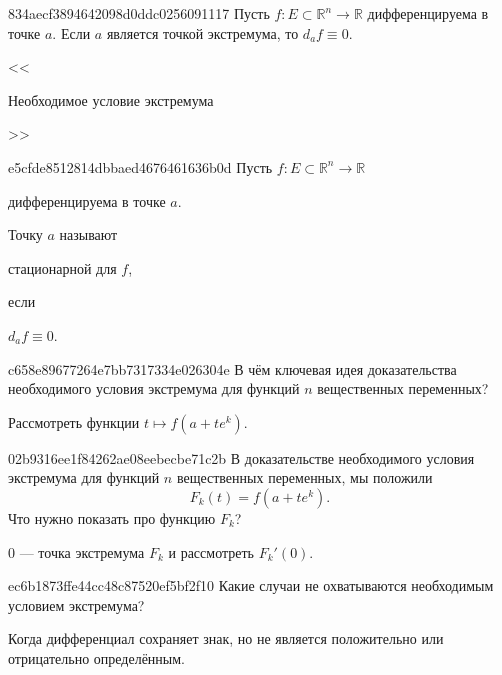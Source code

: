 \begin{note}{834aecf3894642098d0ddc0256091117}
    Пусть \({ f : E \subset \mathbb R^{n} \to \mathbb R }\) дифференцируема в точке \({ a }\).
    Если \({ a }\) является точкой экстремума, то \({ d_{a}f \equiv 0 }\).

    \begin{center}
        \tiny
        <<\begin{icloze}{1}Необходимое условие экстремума\end{icloze}>>
    \end{center}
\end{note}

\begin{note}{e5cfde8512814dbbaed4676461636b0d}
    Пусть \({ f : E \subset \mathbb R^{n} \to \mathbb R }\) \begin{icloze}{3}дифференцируема в точке \({ a }\).\end{icloze}
    Точку \({ a }\) называют \begin{icloze}{2}стационарной для \({ f }\),\end{icloze} если \begin{icloze}{1}\({ d_{a}f \equiv 0 }\).\end{icloze}
\end{note}

\begin{note}{c658e89677264e7bb7317334e026304e}
    В чём ключевая идея доказательства необходимого условия экстремума для функций \({ n }\) вещественных переменных?

    \begin{cloze}{1}
        Рассмотреть функции \({ t \mapsto f(a + te^{k}) }\).
    \end{cloze}
\end{note}

\begin{note}{02b9316ee1f84262ae08eebecbe71c2b}
    В доказательстве необходимого условия экстремума для функций \({ n }\) вещественных переменных, мы положили
    \[
        F_k(t) = f(a + te^{k}).
    \]
    Что нужно показать про функцию \({ F_k }\)?

    \begin{cloze}{1}
        \({ 0 }\) --- точка экстремума \({ F_k }\) и рассмотреть \({ F_k'(0) }\).
    \end{cloze}
\end{note}

\begin{note}{ec6b1873ffe44cc48c87520ef5bf2f10}
    Какие случаи не охватываются необходимым условием экстремума?

    \begin{cloze}{1}
        Когда дифференциал сохраняет знак, но не является положительно или отрицательно определённым.
    \end{cloze}
\end{note}

